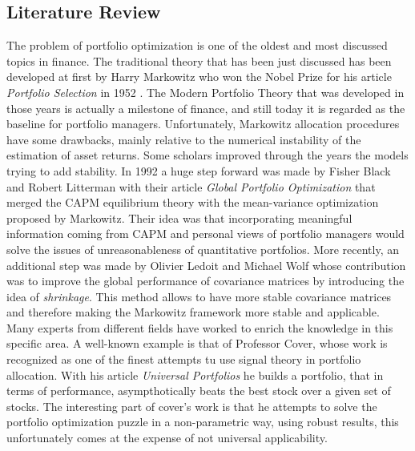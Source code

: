 \documentclass[12pt]{article} %
\numberwithin{equation}{subsection}
\begin{document}





\subsection{Literature Review}

The problem of portfolio optimization is one of the oldest and most discussed topics in finance. The traditional theory that has been just discussed has been developed at first by Harry Markowitz who won the Nobel Prize for his article \textit{Portfolio Selection} in 1952 \cite{Markowitz}. The Modern Portfolio Theory that was developed in those years is actually a milestone of finance, and still today it is regarded as the baseline for portfolio managers. Unfortunately, Markowitz allocation procedures have some drawbacks, mainly relative to the numerical instability of the estimation of asset returns. Some scholars improved through the years the models trying to add stability. In 1992 a huge step forward was made by Fisher Black and Robert Litterman with their article \textit{Global Portfolio Optimization} \cite{black_litterman} that merged the CAPM equilibrium theory with the mean-variance optimization proposed by Markowitz. Their idea was that incorporating meaningful information coming from CAPM and personal views of portfolio managers would solve the issues of unreasonableness of quantitative portfolios. More recently, an additional step was made by Olivier Ledoit and Michael Wolf whose contribution was to improve the global performance of covariance matrices by introducing the idea of \textit{shrinkage}. This method allows to have more stable covariance matrices and therefore making the Markowitz framework more stable and applicable.  \\
Many experts from different fields have worked to enrich the knowledge in this specific area. A well-known example is that of Professor Cover, whose work is recognized as one of the finest attempts tu use signal theory in portfolio allocation. With his article \textit{Universal Portfolios} \cite{universal_portfolios} he builds a portfolio, that in terms of performance, asympthotically beats the best stock over a given set of stocks. The interesting part of cover's work is that he attempts to solve the portfolio optimization puzzle in a non-parametric way, using robust results, this unfortunately comes at the expense of not universal applicability.\\
\end{document}
